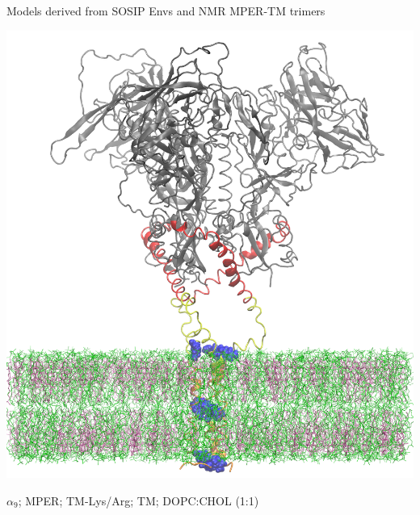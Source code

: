 \begin{frame}[fragile]{Models derived from SOSIP Envs and NMR MPER-TM trimers}
\begin{center}
\begin{minipage}{0.47\textwidth}
\begin{center}
                \includegraphics[width=\textwidth]{5vn3-mper-tm-update-1.png}
            \end{center}
        \end{minipage}
        \textcolor{red!80!black}{$\alpha_9$}; 
        \textcolor{yellow!80!black}{MPER};
        \textcolor{blue!80!black}{TM-Lys/Arg};
        \textcolor{orange!90!black}{TM};
        \textcolor{green!80!black}{DOPC}:\textcolor{pink!90!black}{CHOL} (1:1)
\end{center}
\end{frame}

